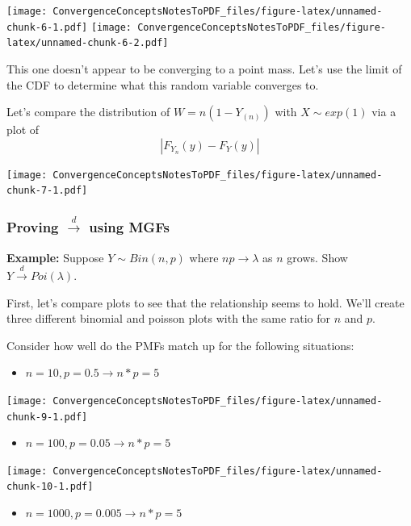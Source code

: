 \documentclass[
]{article}
\providecommand{\tightlist}{%
  \setlength{\itemsep}{0pt}\setlength{\parskip}{0pt}}
\begin{document}
\texttt{[image: ConvergenceConceptsNotesToPDF\_files/figure-latex/unnamed-chunk-6-1.pdf]}
\texttt{[image: ConvergenceConceptsNotesToPDF\_files/figure-latex/unnamed-chunk-6-2.pdf]}

This one doesn't appear to be converging to a point mass. Let's use the
limit of the CDF to determine what this random variable converges to.

Let's compare the distribution of \(W = n(1-Y_{(n)})\) with
\(X \sim exp(1)\) via a plot of \[|F_{Y_n}(y)-F_{Y}(y)|\]

\texttt{[image: ConvergenceConceptsNotesToPDF\_files/figure-latex/unnamed-chunk-7-1.pdf]}

\hypertarget{proving-stackreldrightarrow-using-mgfs}{%
\subsubsection{\texorpdfstring{Proving \(\stackrel{d}\rightarrow\) using
MGFs}{Proving \textbackslash stackrel\{d\}\textbackslash rightarrow using MGFs}}\label{proving-stackreldrightarrow-using-mgfs}}

\textbf{Example:} Suppose \(Y\sim Bin(n,p)\) where
\(np \rightarrow \lambda\) as \(n\) grows. Show
\(Y\stackrel{d}\rightarrow Poi(\lambda)\).

First, let's compare plots to see that the relationship seems to hold.
We'll create three different binomial and poisson plots with the same
ratio for \(n\) and \(p\).

Consider how well do the PMFs match up for the following situations:

\begin{itemize}
\tightlist
\item
  \(n = 10, p = 0.5 \rightarrow n*p = 5\)
\end{itemize}

\texttt{[image: ConvergenceConceptsNotesToPDF\_files/figure-latex/unnamed-chunk-9-1.pdf]}

\begin{itemize}
\tightlist
\item
  \(n = 100, p = 0.05 \rightarrow n*p = 5\)
\end{itemize}

\texttt{[image: ConvergenceConceptsNotesToPDF\_files/figure-latex/unnamed-chunk-10-1.pdf]}

\begin{itemize}
\tightlist
\item
  \(n = 1000, p = 0.005 \rightarrow n*p = 5\)
\end{itemize}
\end{document}
